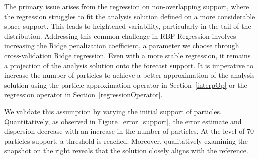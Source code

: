 The primary issue arises from the regression on non-overlapping support, where the regression struggles to fit the analysis solution defined on a more considerable space support. This leads to heightened variability, particularly in the tail of the distribution. Addressing this common challenge in RBF Regression \cite{fornberg_flyer_2015} involves increasing the Ridge penalization coefficient, a parameter we choose through cross-validation Ridge regression.
Even with a more stable regression, it remains a projection of the analysis solution onto the forecast support. It is imperative to increase the number of particles to achieve a better approximation of the analysis solution using the particle approximation operator in Section~\ref{interpOp} or the regression operator in Section~\ref{regressionOperator}.

We validate this assumption by varying the initial support of particles. Quantitatively, as observed in Figure~\ref{error_support}, the error estimate and dispersion decrease with an increase in the number of particles. At the level of 70 particles support, a threshold is reached. Moreover, qualitatively examining the snapshot on the right reveals that the solution closely aligns with the reference.

